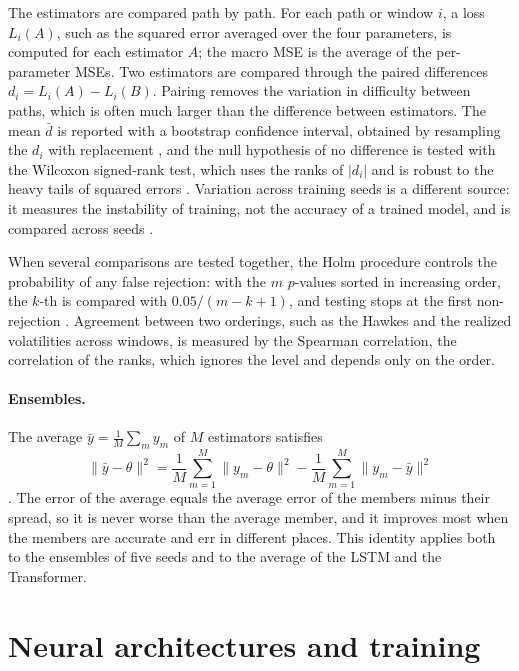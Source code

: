 \label{sec:comparing-theory}
The estimators are compared path by path. For each path or window \(i\), a loss
\(L_i(A)\), such as the squared error averaged over the four parameters, is computed for each
estimator \(A\); the macro MSE is the average of the per-parameter MSEs. Two estimators are
compared through the paired differences \(d_i=L_i(A)-L_i(B)\). Pairing removes the variation
in difficulty between paths, which is often much larger than the difference between
estimators.
The mean \(\bar d\) is reported with a bootstrap confidence interval, obtained by resampling
the \(d_i\) with replacement \citep{efron1993}, and the null hypothesis of no difference is
tested with the Wilcoxon signed-rank test, which uses the ranks of \(|d_i|\) and is robust to
the heavy tails of squared errors \citep{wilcoxon1945,diebold1995}. Variation across training
seeds is a different source: it measures the instability of training, not the accuracy of a
trained model, and is compared across seeds \citep{bouthillier2021}.

When several comparisons are tested together, the Holm procedure controls the probability
of any false rejection: with the \(m\) \(p\)-values sorted in increasing order, the \(k\)-th
is compared with \(0.05/(m-k+1)\), and testing stops at the first non-rejection
\citep{holm1979}. Agreement between two orderings, such as the Hawkes and the realized
volatilities across windows, is measured by the Spearman correlation, the correlation of the
ranks, which ignores the level and depends only on the order.

\paragraph{Ensembles.} The average \(\bar y=\frac1M\sum_m y_m\) of \(M\) estimators satisfies
\[
 \lVert\bar y-\theta\rVert^2=\frac1M\sum_{m=1}^{M}\lVert y_m-\theta\rVert^2
 -\frac1M\sum_{m=1}^{M}\lVert y_m-\bar y\rVert^2
\]
\citep{krogh1995}. The error of the average equals the average error of the members minus
their spread, so it is never worse than the average member, and it improves most when the
members are accurate and err in different places. This identity applies both to the
ensembles of five seeds and to the average of the LSTM and the Transformer.

\section{Neural architectures and training}

